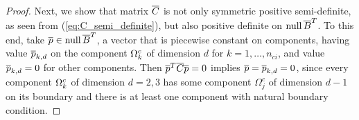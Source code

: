 \begin{proof}
{Next, we show that matrix $\overline{C}$ is not only symmetric positive 
semi-definite, as seen from (\ref{eq:C_semi_definite}), but also positive definite on 
$\text{null}\,\overline{B}^T$. To this end, take $\overline{p} \in 
\mbox{null}\,\overline{B}^T$, a vector  
that is piecewise constant on components, having value $\overline{p}_{k,d}$ on the 
component $\Omega^c_k$ of dimension $d$ for $k=1,\dots, n_{ci}$, and value 
$\overline{p}_{k,d}=0$ for other components. 
Then $\overline{p}^T \overline{C}\overline{p}=0$ implies 
$\overline{p}=\overline{p}_{k,d}=0$, since every component $\Omega^c_k$ of dimension $d=2,3$ 
has some component $\Omega^c_j$ of dimension $d-1$ on its boundary and there is 
at least one component with natural boundary condition.


}
\end{proof}
